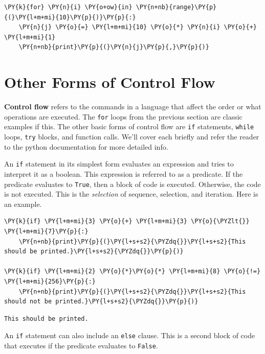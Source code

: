 \begin{Verbatim}[commandchars=\\\{\}]
\PY{k}{for} \PY{n}{i} \PY{o+ow}{in} \PY{n+nb}{range}\PY{p}{(}\PY{l+m+mi}{10}\PY{p}{)}\PY{p}{:}
    \PY{n}{j} \PY{o}{=} \PY{l+m+mi}{10} \PY{o}{*} \PY{n}{i} \PY{o}{+} \PY{l+m+mi}{1}
    \PY{n+nb}{print}\PY{p}{(}\PY{n}{j}\PY{p}{,}\PY{p}{)}
\end{Verbatim}


\section{Other Forms of Control Flow}


\textbf{Control flow} refers to the commands in a language that affect the order or what operations are executed.
The \texttt{for} loops from the previous section are classic examples if this.  The other basic forms of control flow are \texttt{if} statements, \texttt{while} loops,  \texttt{try} blocks, and function calls.  We’ll cover each briefly and refer the reader to the python documentation for more detailed info.


An \texttt{if} statement in its simplest form evaluates an expression and tries to interpret it as a boolean.  This expression is referred to as a predicate.  If the predicate evaluates to \texttt{True}, then a block of code is executed.  Otherwise, the code is not executed.  This is the \emph{selection} of sequence, selection, and iteration.  Here is an example.


\begin{Verbatim}[commandchars=\\\{\}]
\PY{k}{if} \PY{l+m+mi}{3} \PY{o}{+} \PY{l+m+mi}{3} \PY{o}{\PYZlt{}} \PY{l+m+mi}{7}\PY{p}{:}
    \PY{n+nb}{print}\PY{p}{(}\PY{l+s+s2}{\PYZdq{}}\PY{l+s+s2}{This should be printed.}\PY{l+s+s2}{\PYZdq{}}\PY{p}{)}

\PY{k}{if} \PY{l+m+mi}{2} \PY{o}{*}\PY{o}{*} \PY{l+m+mi}{8} \PY{o}{!=} \PY{l+m+mi}{256}\PY{p}{:}
    \PY{n+nb}{print}\PY{p}{(}\PY{l+s+s2}{\PYZdq{}}\PY{l+s+s2}{This should not be printed.}\PY{l+s+s2}{\PYZdq{}}\PY{p}{)}
\end{Verbatim}

\begin{Verbatim}
This should be printed.

\end{Verbatim}


An \texttt{if} statement can also include an \texttt{else} clause.  This is a second block of code that executes if the predicate evaluates to \texttt{False}.


